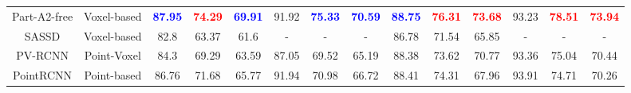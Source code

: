 \begin{table}[t]
{\begin{tabular}{c|c||ccc|ccc|ccc|ccc}
Part-A2-free                                                                                      & Voxel-based                                                       & \textbf{\textcolor{blue}{87.95}} & \textcolor{red}{\textbf{74.29}}  & \textbf{\textcolor{blue}{69.91}} & 91.92                            & \textbf{\textcolor{blue}{75.33}} & \textbf{\textcolor{blue}{70.59}} & \textbf{\textcolor{blue}{88.75}} & \textcolor{red}{\textbf{76.31}}  & \textcolor{red}{\textbf{73.68}}  & 93.23                            & \textcolor{red}{\textbf{78.51}}  & \textcolor{red}{\textbf{73.94}}   \\
SASSD                                                                                             & Voxel-based                                                       & 82.8                             & 63.37                            & 61.6                             & -                                & -                                & -                                & 86.78                            & 71.54                            & 65.85                            & -                                & -                                & -                                 \\ 
\arrayrulecolor{black}\cline{1-2}\arrayrulecolor{black}\cline{3-4}\arrayrulecolor{black}\cline{5-5}\arrayrulecolor{black}\cline{6-7}\arrayrulecolor{black}\cline{8-8}\arrayrulecolor{black}\cline{9-10}\arrayrulecolor{black}\cline{11-11}\arrayrulecolor{black}\cline{12-14}
PV-RCNN                                                                                           & Point-Voxel                                                       & 84.3                             & 69.29                            & 63.59                            & 87.05                            & 69.52                            & 65.19                            & 88.38                            & 73.62                            & 70.77                            & 93.36                            & 75.04                            & 70.44                             \\ 
\arrayrulecolor{black}\cline{1-2}\arrayrulecolor{black}\cline{3-4}\arrayrulecolor{black}\cline{5-5}\arrayrulecolor{black}\cline{6-7}\arrayrulecolor{black}\cline{8-8}\arrayrulecolor{black}\cline{9-10}\arrayrulecolor{black}\cline{11-11}\arrayrulecolor{black}\cline{12-14}
PointRCNN                                                                                         & Point-based                                                       & 86.76                            & 71.68                            & 65.77                            & 91.94                            & 70.98                            & 66.72                            & 88.41                            & 74.31                            & 67.96                            & 93.91                            & 74.71                            & 70.26                             \\

\end{tabular}}
\end{table}

